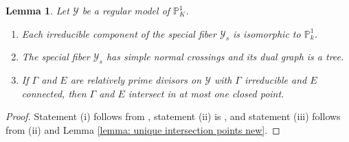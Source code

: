 \documentclass[12pt]{amsart}
\numberwithin{equation}{section}
\newtheorem{lemma}[equation]{Lemma}
\theoremstyle{definition}
\renewcommand{\P}{\mathbb P}
\newcommand{\Y}{\mathcal{Y}}
\begin{document}
\begin{lemma}\label{lemma: unique intersection points}
    Let $\Y$ be a regular model of $\P^1_K$.
    \begin{enumerate}[\upshape (i)]
        \item Each irreducible component of the special fiber $\Y_s$ is isomorphic to $\P^1_k$.
        \item The special fiber $\Y_s$ has simple normal crossings and its dual graph is a tree.
        \item If $\Gamma$ and $E$ are relatively prime divisors on $\Y$ with $\Gamma$ irreducible and $E$ connected, then $\Gamma$ and $E$ intersect in at most one closed point.
    \end{enumerate}
\end{lemma}
\begin{proof}
    Statement (i) follows from \cite[Lemma 7.1]{ObusWewers}, statement (ii) is \cite[Lemma 7.7]{Part 1}, and statement (iii) follows from (ii) and Lemma \ref{lemma: unique intersection points new}.
\end{proof}
\end{document}
